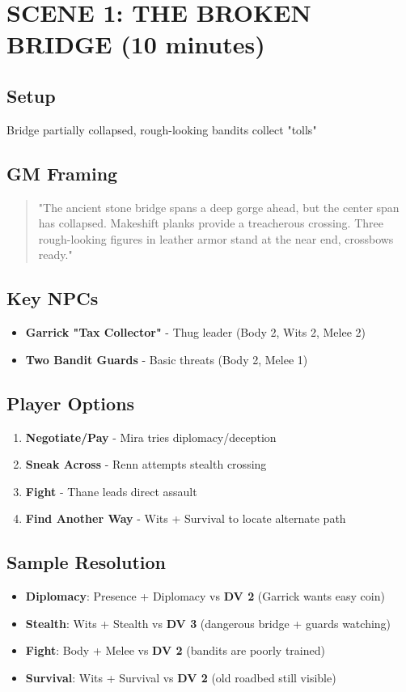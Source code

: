 \documentclass[12pt]{article}
\newcommand{\dv}[1]{\textbf{DV #1}}
\begin{document}
\section{SCENE 1: THE BROKEN BRIDGE (10 minutes)}

\subsection*{Setup}
Bridge partially collapsed, rough-looking bandits collect "tolls"

\subsection*{GM Framing}
\begin{quote}
"The ancient stone bridge spans a deep gorge ahead, but the center span has collapsed. Makeshift planks provide a treacherous crossing. Three rough-looking figures in leather armor stand at the near end, crossbows ready."
\end{quote}

\subsection*{Key NPCs}
\begin{itemize}
\item \textbf{Garrick "Tax Collector"} - Thug leader (Body 2, Wits 2, Melee 2)
\item \textbf{Two Bandit Guards} - Basic threats (Body 2, Melee 1)
\end{itemize}

\subsection*{Player Options}
\begin{enumerate}
\item \textbf{Negotiate/Pay} - Mira tries diplomacy/deception
\item \textbf{Sneak Across} - Renn attempts stealth crossing  
\item \textbf{Fight} - Thane leads direct assault
\item \textbf{Find Another Way} - Wits + Survival to locate alternate path
\end{enumerate}

\subsection*{Sample Resolution}
\begin{itemize}
\item \textbf{Diplomacy}: Presence + Diplomacy vs \dv{2} (Garrick wants easy coin)
\item \textbf{Stealth}: Wits + Stealth vs \dv{3} (dangerous bridge + guards watching)
\item \textbf{Fight}: Body + Melee vs \dv{2} (bandits are poorly trained)
\item \textbf{Survival}: Wits + Survival vs \dv{2} (old roadbed still visible)
\end{itemize}
\end{document}
